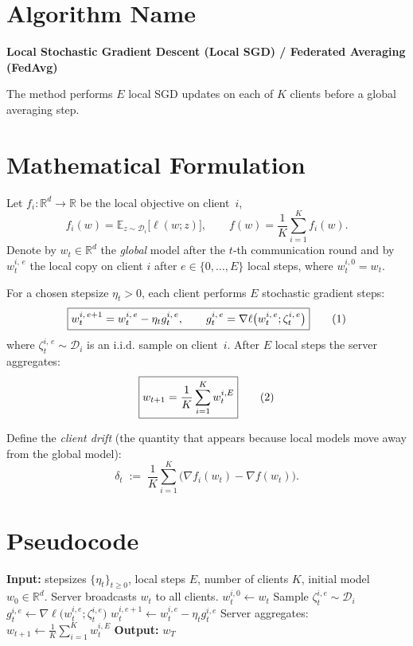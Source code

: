 \documentclass{article}
\newcommand{\E}{\mathbb{E}}
\newcommand{\R}{\mathbb{R}}
\newcommand{\grad}{\nabla}
\begin{document}
\section*{Algorithm Name}
\textbf{Local Stochastic Gradient Descent (Local SGD) / Federated Averaging (FedAvg)}  

The method performs $E$ local SGD updates on each of $K$ clients before a global averaging step.

\section*{Mathematical Formulation}
Let $f_i:\R^d\to\R$ be the local objective on client~$i$,
\[
f_i(w)=\E_{z\sim\mathcal D_i}\bigl[ \ell(w;z)\bigr],\qquad 
f(w)=\frac1K\sum_{i=1}^K f_i(w).
\]
Denote by $w_t\in\R^d$ the \emph{global} model after the $t$‑th communication round and by
$w_{t}^{i,\,e}$ the local copy on client $i$ after $e\in\{0,\dots,E\}$ local steps, where
$w_{t}^{i,0}=w_t$.

For a chosen stepsize $\eta_t>0$, each client performs $E$ stochastic gradient steps:
\[
\boxed{%
w_{t}^{i,\,e+1}=w_{t}^{i,\,e}-\eta_t g_{t}^{i,\,e},\qquad 
g_{t}^{i,\,e}= \grad\ell\bigl(w_{t}^{i,\,e};\zeta_{t}^{i,\,e}\bigr)
}
\tag{1}
\]
where $\zeta_{t}^{i,\,e}\sim\mathcal D_i$ is an i.i.d. sample on client~$i$.
After $E$ local steps the server aggregates:
\[
\boxed{%
w_{t+1}= \frac1K\sum_{i=1}^K w_{t}^{i,E}
}
\tag{2}
\]

Define the \emph{client drift} (the quantity that appears because local models move away from the global model):
\[
\delta_t \;:=\; \frac1K\sum_{i=1}^K \bigl(\grad f_i(w_t)-\grad f(w_t)\bigr).
\tag{3}
\]

\section*{Pseudocode}
\begin{algorithm}[H]
\caption{Local SGD (FedAvg)}\label{alg:localsgd}
\begin{algorithmic}[1]
\State \textbf{Input:} stepsizes $\{\eta_t\}_{t\ge0}$, local steps $E$, number of clients $K$,
initial model $w_0\in\R^d$.
    \State Server broadcasts $w_t$ to all clients.
        \State $w_{t}^{i,0}\gets w_t$
            \State Sample $\zeta_{t}^{i,e}\sim\mathcal D_i$
            \State $g_{t}^{i,e}\gets \grad\ell\!\bigl(w_{t}^{i,e};\zeta_{t}^{i,e}\bigr)$
            \State $w_{t}^{i,e+1}\gets w_{t}^{i,e}-\eta_t g_{t}^{i,e}$ 
        \EndFor
    \EndFor
    \State Server aggregates: $w_{t+1}\gets \frac1K\sum_{i=1}^K w_{t}^{i,E}$
\EndFor
\State \textbf{Output:} $w_T$
\end{algorithmic}
\end{algorithm}
\end{document}
